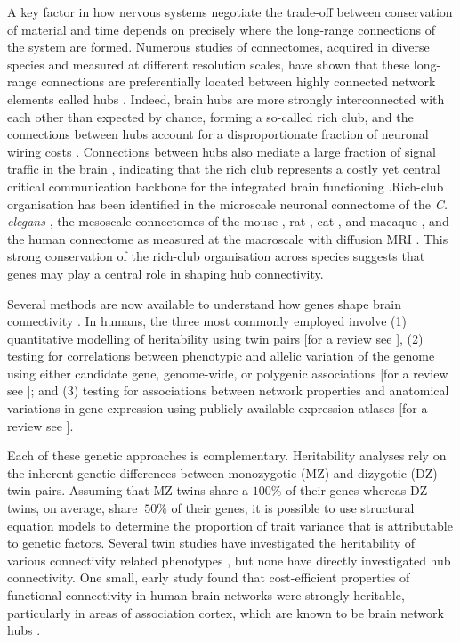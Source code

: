 A key factor in how nervous systems negotiate the trade-off between conservation of material and time depends on precisely where the long-range connections of the system are formed. Numerous studies of connectomes, acquired in diverse species and measured at different resolution scales, have shown that these long-range connections are preferentially located between highly connected network elements called hubs \citep{Harriger2012,Towlson2013,VandenHeuvel2011,VandenHeuvel2013b}. Indeed, brain hubs are more strongly interconnected with each other than expected by chance, forming a so-called rich club, and the connections between hubs account for a disproportionate fraction of neuronal wiring costs \citep{Arnatkeviciute2018,Fulcher2016,Harriger2012,Towlson2013,VandenHeuvel2011}. Connections between hubs also mediate a large fraction of signal traffic in the brain \citep{Misic2016,VandenHeuvel2011}, indicating that the rich club represents a costly yet central critical communication backbone for the integrated brain functioning \citep{Gratton2012,Markov2013a,VandenHeuvel2018,VandenHeuvel2013a}.Rich-club organisation has been identified in the microscale neuronal connectome of the \textit{C. elegans} \citep{Towlson2013}, the mesoscale connectomes of the mouse \citep{Fulcher2016}, rat \citep{Liang2017}, cat \citep{DeReus2013b}, and macaque \citep{Harriger2012}, and the human connectome as measured at the macroscale with diffusion MRI \citep{VandenHeuvel2011}. This strong conservation of the rich-club organisation across species suggests that genes may play a central role in shaping hub connectivity. 

Several methods are now available to understand how genes shape brain connectivity \citep{Lein2017,Luo2018}. In humans, the three most commonly employed involve (1) quantitative modelling of heritability using twin pairs [for a review see \citep{Jansen2015}], (2) testing for correlations between phenotypic and allelic variation of the genome using either candidate gene, genome-wide, or polygenic associations [for a review see \citep{Thompson2013}]; and (3) testing for associations between network properties and anatomical variations in gene expression using publicly available expression atlases [for a review see \citep{Fornito2019}]. 

Each of these genetic approaches is complementary. Heritability analyses rely on the inherent genetic differences between monozygotic (MZ) and dizygotic (DZ) twin pairs. Assuming that MZ twins share a $100\%$ of their genes whereas DZ twins, on average, share $~50\%$ of their genes, it is possible to use structural equation models to determine the proportion of trait variance that is attributable to genetic factors. Several twin studies have investigated the heritability of various connectivity related phenotypes \citep{Bohlken2014,Colclough2017,Fu2015,Shen2014,Sudre2017}, but none have directly investigated hub connectivity. One small, early study found that cost-efficient properties of functional connectivity in human brain networks were strongly heritable, particularly in areas of association cortex, which are known to be brain network hubs \citep{Fornito2011}. 

